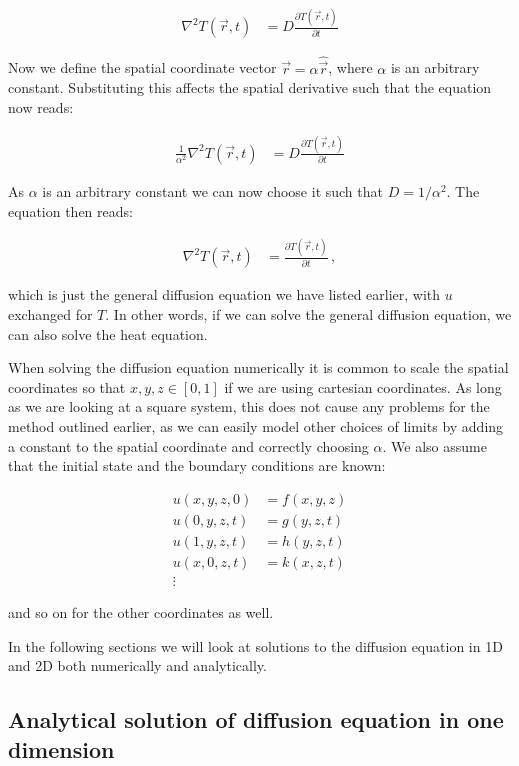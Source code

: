 \documentclass[reprint,english,notitlepage]{revtex4-1}  %
\begin{document}
\begin{align*}
\nabla^2 T(\vec{r},t) &= D \frac{\partial T(\vec{r},t)}{\partial t}
\end{align*}

Now we define the spatial coordinate vector $\vec{r} = \alpha \hat{\vec{r}}$, where $\alpha$ is an arbitrary constant. Substituting this affects the spatial derivative such that the equation now reads:

\begin{align*}
\frac{1}{\alpha^2} \nabla^2 T(\vec{r},t) &= D \frac{\partial T(\vec{r},t)}{\partial t}
\end{align*}  

As $\alpha$ is an arbitrary constant we can now choose it such that $D = 1/\alpha^2$. The equation then reads:

\begin{align*}
\nabla^2 T(\vec{r},t) &= \frac{\partial T(\vec{r},t)}{\partial t} \, ,
\end{align*}

which is just the general diffusion equation we have listed earlier, with $u$ exchanged for $T$. In other words, if we can solve the general diffusion equation, we can also solve the heat equation.

When solving the diffusion equation numerically it is common to scale the spatial coordinates so that $x,y,z \in [0,1]$ if we are using cartesian coordinates. As long as we are looking at a square system, this does not cause any problems for the method outlined earlier, as we can easily model other choices of limits by adding a constant to the spatial coordinate and correctly choosing $\alpha$. We also assume that the initial state and the boundary conditions are known: 

\begin{align*}
u(x,y,z,0) &= f(x,y,z) \\
u(0,y,z,t) &= g(y,z,t) \\
u(1,y,z,t) &= h(y,z,t) \\
u(x,0,z,t) &= k(x,z,t) \\
\vdots 
\end{align*}

and so on for the other coordinates as well.
 
In the following sections we will look at solutions to the diffusion equation in 1D and 2D both numerically and analytically.




\subsection{Analytical solution of diffusion equation in one dimension} \label{sec:formalism_1D_diff_eq_analytical}
\end{document}
